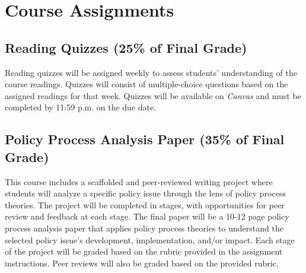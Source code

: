 \documentclass[11pt, letterpaper]{article}
\begin{document}
\section{Course Assignments}

\subsection*{Reading Quizzes (25\% of Final Grade)}
Reading quizzes will be assigned weekly to assess students' understanding of the course readings. Quizzes will consist of multiple-choice questions based on the assigned readings for that week. Quizzes will be available on \emph{Canvas} and must be completed by 11:59 p.m. on the due date.

\subsection*{Policy Process Analysis Paper (35\% of Final Grade)}
This course includes a scaffolded and peer-reviewed writing project where students will analyze a specific policy issue through the lens of policy process theories. The project will be completed in stages, with opportunities for peer review and feedback at each stage. The final paper will be a 10-12 page policy process analysis paper that applies policy process theories to understand the selected policy issue's development, implementation, and/or impact. Each stage of the project will be graded based on the rubric provided in the assignment instructions. Peer reviews will also be graded based on the provided rubric.
\end{document}
